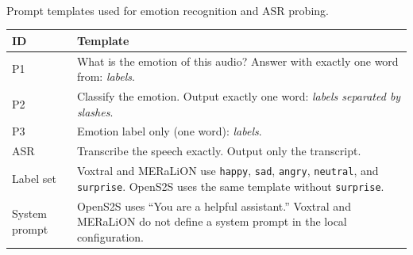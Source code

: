 \begin{center}
\label{tab:app_prompt_templates}
{\footnotesize \MakeUppercase{\tablename}~\thetable}\\
{\scriptsize Prompt templates used for emotion recognition and ASR probing.}\par
\vspace{2pt}
\centering
\scriptsize
\setlength{\tabcolsep}{4pt}
\begin{tabularx}{\columnwidth}{l X}
\toprule
\textbf{ID} & \textbf{Template} \\
\midrule
P1 & What is the emotion of this audio? Answer with exactly one word from: \emph{labels}. \\
P2 & Classify the emotion. Output exactly one word: \emph{labels separated by slashes}. \\
P3 & Emotion label only (one word): \emph{labels}. \\
ASR & Transcribe the speech exactly. Output only the transcript. \\
Label set & Voxtral and MERaLiON use \texttt{happy}, \texttt{sad}, \texttt{angry}, \texttt{neutral}, and \texttt{surprise}.  OpenS2S uses the same template without \texttt{surprise}. \\
System prompt & OpenS2S uses ``You are a helpful assistant.'' Voxtral and MERaLiON do not define a system prompt in the local configuration. \\
\bottomrule
\end{tabularx}
\end{center}

